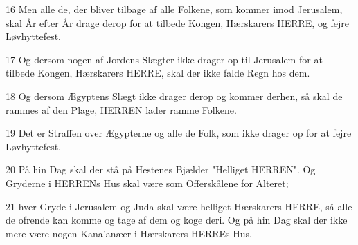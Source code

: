 \par 16 Men alle de, der bliver tilbage af alle Folkene, som kommer imod Jerusalem, skal År efter År drage derop for at tilbede Kongen, Hærskarers HERRE, og fejre Løvhyttefest.
\par 17 Og dersom nogen af Jordens Slægter ikke drager op til Jerusalem for at tilbede Kongen, Hærskarers HERRE, skal der ikke falde Regn hos dem.
\par 18 Og dersom Ægyptens Slægt ikke drager derop og kommer derhen, så skal de rammes af den Plage, HERREN lader ramme Folkene.
\par 19 Det er Straffen over Ægypterne og alle de Folk, som ikke drager op for at fejre Løvhyttefest.
\par 20 På hin Dag skal der stå på Hestenes Bjælder "Helliget HERREN". Og Gryderne i HERRENs Hus skal være som Offerskålene for Alteret;
\par 21 hver Gryde i Jerusalem og Juda skal være helliget Hærskarers HERRE, så alle de ofrende kan komme og tage af dem og koge deri. Og på hin Dag skal der ikke mere være nogen Kana'anæer i Hærskarers HERREs Hus.


